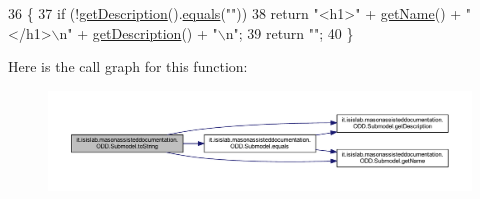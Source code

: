 \begin{DoxyCode}
36                             \{
37         \textcolor{keywordflow}{if} (!\hyperlink{classit_1_1isislab_1_1masonassisteddocumentation_1_1_o_d_d_1_1_submodel_a4174d83304f84ad1c026c8096ea3a987}{getDescription}().\hyperlink{classit_1_1isislab_1_1masonassisteddocumentation_1_1_o_d_d_1_1_submodel_afef2a783ff6aaf811ced69506a527265}{equals}(\textcolor{stringliteral}{""}))
38             \textcolor{keywordflow}{return} \textcolor{stringliteral}{"<h1>"} + \hyperlink{classit_1_1isislab_1_1masonassisteddocumentation_1_1_o_d_d_1_1_submodel_a52d60158adf71622ba8554abb72a12b9}{getName}() + \textcolor{stringliteral}{"</h1>\(\backslash\)n"} + \hyperlink{classit_1_1isislab_1_1masonassisteddocumentation_1_1_o_d_d_1_1_submodel_a4174d83304f84ad1c026c8096ea3a987}{getDescription}() + \textcolor{stringliteral}{"\(\backslash\)n"};
39         \textcolor{keywordflow}{return} \textcolor{stringliteral}{""};
40     \}
\end{DoxyCode}


Here is the call graph for this function\-:
\nopagebreak
\begin{figure}[H]
\begin{center}
\leavevmode
\includegraphics[width=350pt]{classit_1_1isislab_1_1masonassisteddocumentation_1_1_o_d_d_1_1_submodel_a15e128a6ac94c77a75d85a903a2d40a4_cgraph}
\end{center}
\end{figure}




